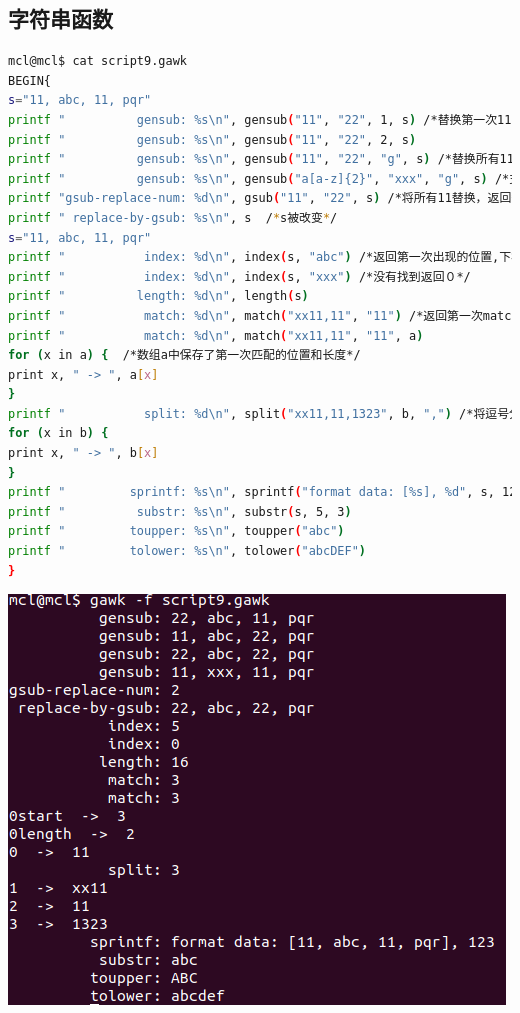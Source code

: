 \documentclass{article}
\begin{document}
\subsection{字符串函数}
\begin{lstlisting}[language=bash, caption={7.2}]
mcl@mcl$ cat script9.gawk 
BEGIN{
s="11, abc, 11, pqr"
printf "          gensub: %s\n", gensub("11", "22", 1, s) /*替换第一次11*/
printf "          gensub: %s\n", gensub("11", "22", 2, s)
printf "          gensub: %s\n", gensub("11", "22", "g", s) /*替换所有11*/
printf "          gensub: %s\n", gensub("a[a-z]{2}", "xxx", "g", s) /*支持正则表达式*/
printf "gsub-replace-num: %d\n", gsub("11", "22", s) /*将所有11替换，返回替换的个数*/
printf " replace-by-gsub: %s\n", s  /*s被改变*/
s="11, abc, 11, pqr"
printf "           index: %d\n", index(s, "abc") /*返回第一次出现的位置,下标从１开始*/
printf "           index: %d\n", index(s, "xxx") /*没有找到返回０*/
printf "          length: %d\n", length(s)
printf "           match: %d\n", match("xx11,11", "11") /*返回第一次match的起始位置*/
printf "           match: %d\n", match("xx11,11", "11", a)
for (x in a) {  /*数组a中保存了第一次匹配的位置和长度*/
print x, " -> ", a[x]
}
printf "           split: %d\n", split("xx11,11,1323", b, ",") /*将逗号分隔的结果放到b*/
for (x in b) {
print x, " -> ", b[x]
}
printf "         sprintf: %s\n", sprintf("format data: [%s], %d", s, 123)
printf "          substr: %s\n", substr(s, 5, 3)
printf "         toupper: %s\n", toupper("abc")
printf "         tolower: %s\n", tolower("abcDEF")
}
\end{lstlisting}
\includegraphics[scale=0.8]{pic1.png} \par
\end{document}
